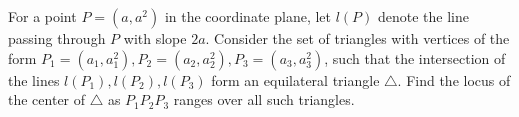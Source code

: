 For a point $P=\left(a,a^2\right)$ in the coordinate plane, let $l\left(P\right)$ denote the line passing through $P$ with slope $2a$. Consider the set of triangles with vertices of the form $P_1=\left(a_1,a_1^2\right),P_2=\left(a_2,a_2^2\right),P_3=\left(a_3,a_3^2\right)$, such that the intersection of the lines $l\left(P_1\right),l\left(P_2\right),l\left(P_3\right)$ form an equilateral triangle $\triangle$. Find the locus of the center of $\triangle$ as $P_1P_2P_3$ ranges over all such triangles.